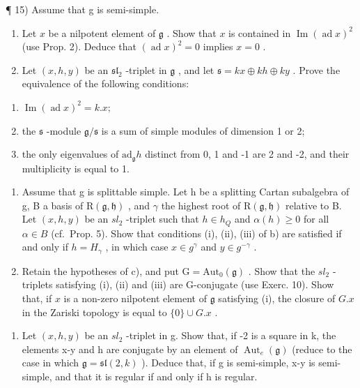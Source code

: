 ¶ 15) Assume that g is semi-simple.

\begin{enumerate}
\def\labelenumi{\alph{enumi})}
\item
  Let \(x\) be a nilpotent element of \(\mathfrak{g}\) . Show that \(x\) is contained in \(\operatorname{Im}(\operatorname{ad} x)^2\) (use Prop. 2). Deduce that \((\operatorname{ad} x)^2 = 0\) implies \(x = 0\) .
\item
  Let \((x,h,y)\) be an \(\mathfrak{sl}_2\) -triplet in \(\mathfrak{g}\) , and let \(\mathfrak{s} = kx\oplus kh\oplus ky\) . Prove the equivalence of the following conditions:
\end{enumerate}

\begin{enumerate}
\def\labelenumi{(\roman{enumi})}
\item
  \(\operatorname{Im}(\operatorname{ad} x)^{2}=k.x;\)
\item
  the \(\mathfrak{s}\) -module \(\mathfrak{g} / \mathfrak{s}\) is a sum of simple modules of dimension 1 or 2;
\item
  the only eigenvalues of \(\mathrm{ad}_{\mathfrak{g}}h\) distinct from 0, 1 and -1 are 2 and -2, and their multiplicity is equal to 1.
\end{enumerate}

\begin{enumerate}
\def\labelenumi{\alph{enumi})}
\setcounter{enumi}{2}
\item
  Assume that g is splittable simple. Let h be a splitting Cartan subalgebra of g, B a basis of \(\mathrm{R}(\mathfrak{g},\mathfrak{h})\) , and \(\gamma\) the highest root of \(\mathrm{R}(\mathfrak{g},\mathfrak{h})\) relative to B. Let \((x,h,y)\) be an \(sl_{2}\) -triplet such that \(h\in h_{Q}\) and \(\alpha(h)\geq0\) for all \(\alpha\in B\) (cf.~Prop. 5). Show that conditions (i), (ii), (iii) of b) are satisfied if and only if \(h=H_{\gamma}\) , in which case \(x\in g^{\gamma}\) and \(y\in g^{-\gamma}\) .
\item
  Retain the hypotheses of c), and put \(\mathrm{G} = \mathrm{Aut}_{0}(\mathfrak{g})\) . Show that the \(sl_{2}\) -triplets satisfying (i), (ii) and (iii) are G-conjugate (use Exerc. 10). Show that, if \(x\) is a non-zero nilpotent element of \(\mathfrak{g}\) satisfying (i), the closure of \(G.x\) in the Zariski topology is equal to \(\{0\} \cup G.x\) .
\end{enumerate}

\begin{enumerate}
\def\labelenumi{\arabic{enumi})}
\setcounter{enumi}{15}
\tightlist
\item
  Let \((x,h,y)\) be an \(sl_{2}\) -triplet in g. Show that, if -2 is a square in k, the elements x-y and h are conjugate by an element of \(\operatorname{Aut}_{e}(\mathfrak{g})\) (reduce to the case in which \(\mathfrak{g}=\mathfrak{sl}(2,k)\) ). Deduce that, if g is semi-simple, x-y is semi-simple, and that it is regular if and only if h is regular.
\end{enumerate}

